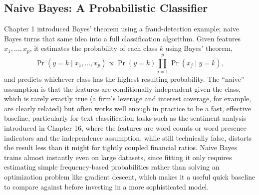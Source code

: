 \documentclass[../ai_in_finance]{subfiles}
\begin{document}
\subsection{Naive Bayes: A Probabilistic Classifier}

Chapter 1 introduced Bayes' theorem using a fraud-detection example; naive Bayes turns that same idea into a full classification algorithm. Given features $x_1, \ldots, x_p$, it estimates the probability of each class $k$ using Bayes' theorem,
\begin{equation*}
\Pr(y=k \mid x_1, \ldots, x_p) \propto \Pr(y=k) \prod_{j=1}^p \Pr(x_j \mid y=k),
\end{equation*}
and predicts whichever class has the highest resulting probability. The ``naive'' assumption is that the features are conditionally independent given the class, which is rarely exactly true (a firm's leverage and interest coverage, for example, are clearly related) but often works well enough in practice to be a fast, effective baseline, particularly for text classification tasks such as the sentiment analysis introduced in Chapter 16, where the features are word counts or word presence indicators and the independence assumption, while still technically false, distorts the result less than it might for tightly coupled financial ratios. Naive Bayes trains almost instantly even on large datasets, since fitting it only requires estimating simple frequency-based probabilities rather than solving an optimization problem like gradient descent, which makes it a useful quick baseline to compare against before investing in a more sophisticated model.
\end{document}

